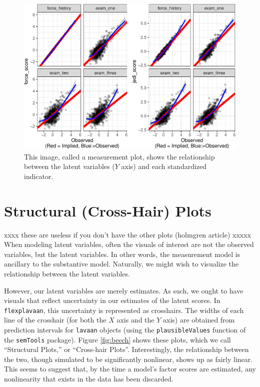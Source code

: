 \documentclass[
  english,
  doc]{apa6}
\begin{document}
\begin{figure}
\centering
\includegraphics{flexplavaan_draft_files/figure-latex/measurementplot-1.pdf}
\caption{\label{fig:measurementplot}This image, called a measurement plot, shows the relationship between the latent variables (\(Y\) axis) and each standardized indicator.}
\end{figure}

\hypertarget{structural-cross-hair-plots}{%
\section{Structural (Cross-Hair) Plots}\label{structural-cross-hair-plots}}

xxxx these are useless if you don't have the other plots (holmgren article) xxxxx
When modeling latent variables, often the visuals of interest are not the observed variables, but the latent variables. In other words, the measurement model is ancillary to the substantive model. Naturally, we might wish to visualize the relationship between the latent variables.

However, our latent variables are merely estimates. As such, we ought to have visuals that reflect uncertainty in our estimates of the latent scores. In \texttt{flexplavaan}, this uncertainty is represented as crosshairs. The widths of each line of the crosshair (for both the \(X\) axis and the \(Y\) axis) are obtained from prediction intervals for \texttt{lavaan} objects (using the \texttt{plausibleValues} function of the \texttt{semTools} package). Figure \ref{fig:beech} shows these plots, which we call ``Structural Plots,'' or ``Cross-hair Plots''. Interestingly, the relationship between the two, though simulated to be significantly nonlinear, shows up as fairly linear. This seems to suggest that, by the time a model's factor scores are estimated, any nonlinearity that exists in the data has been discarded.
\end{document}
